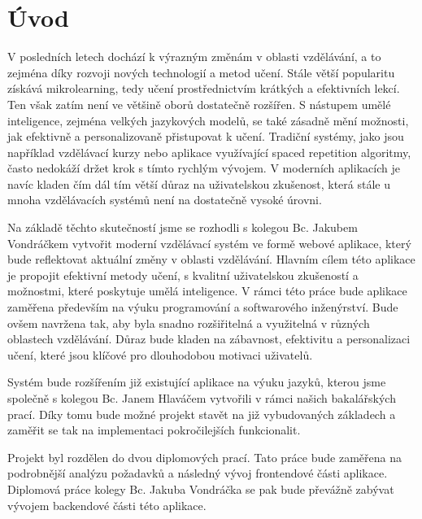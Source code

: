 \chapter*{Úvod}
\setcounter{page}{1}

V posledních letech dochází k výrazným změnám v oblasti vzdělávání, a to zejména díky rozvoji nových technologií a metod učení. Stále větší popularitu získává mikrolearning, tedy učení prostřednictvím krátkých a efektivních lekcí. Ten však zatím není ve většině oborů dostatečně rozšířen. S nástupem umělé inteligence, zejména velkých jazykových modelů, se také zásadně mění možnosti, jak efektivně a personalizovaně přistupovat k učení. Tradiční systémy, jako jsou například vzdělávací kurzy nebo aplikace využívající spaced repetition algoritmy, často nedokáží držet krok s tímto rychlým vývojem. V moderních aplikacích je navíc kladen čím dál tím větší důraz na uživatelskou zkušenost, která stále u mnoha vzdělávacích systémů není na dostatečně vysoké úrovni.

Na základě těchto skutečností jsme se rozhodli s kolegou Bc. Jakubem Vondráčkem vytvořit moderní vzdělávací systém ve formě webové aplikace, který bude reflektovat aktuální změny v oblasti vzdělávání. Hlavním cílem této aplikace je propojit efektivní metody učení, s kvalitní uživatelskou zkušeností a možnostmi, které poskytuje umělá inteligence. V rámci této práce bude aplikace zaměřena především na výuku programování a softwarového inženýrství. Bude ovšem navržena tak, aby byla snadno rozšiřitelná a využitelná v různých oblastech vzdělávání. Důraz bude kladen na zábavnost, efektivitu a personalizaci učení, které jsou klíčové pro dlouhodobou motivaci uživatelů.

Systém bude rozšířením již existující aplikace na výuku jazyků, kterou jsme společně s kolegou Bc. Janem Hlaváčem vytvořili v rámci našich bakalářských prací. Díky tomu bude možné projekt stavět na již vybudovaných základech a zaměřit se tak na implementaci pokročilejších funkcionalit. %

Projekt byl rozdělen do dvou diplomových prací. Tato práce bude zaměřena na podrobnější analýzu požadavků a následný vývoj frontendové části aplikace. Diplomová práce kolegy Bc. Jakuba Vondráčka se pak bude převážně zabývat vývojem backendové části této aplikace.

